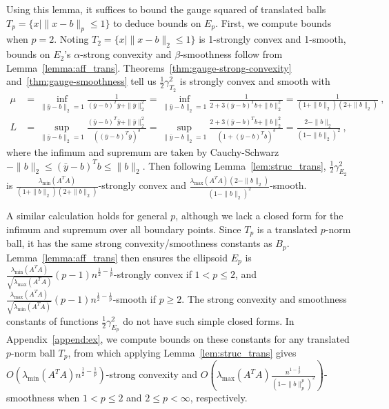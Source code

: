 \documentclass[sn-mathphys,Numbered]{sn-jnl}%
\begin{document}
Using this lemma, it suffices to bound the gauge squared of translated balls $T_p=\{x \mid \|x-b\|_p \leq 1\}$ to deduce bounds on $E_p$.
First, we compute bounds when $p=2$. Noting $T_2=\{x \mid \|x-b\|_2 \leq 1\}$ is 1-strongly convex and 1-smooth, bounds on $E_2$'s $\alpha$-strong convexity and $\beta$-smoothness follow from Lemma~\ref{lemma:aff_trans}. Theorems~\ref{thm:gauge-strong-convexity} and~\ref{thm:gauge-smoothness} tell us $\frac{1}{2}\gamma_{T_2}^2$ is strongly convex and smooth with
\begin{align*}
    \mu &= \inf_{\|\bar y -b\|_2=1} \frac{1}{(\bar y-b)^T\bar y+\|\bar y\|^2_2} = \inf_{\|\bar y -b\|_2=1} \frac{1}{2+3(\bar y-b)^Tb+\|b\|^2_2}
    = \frac{1}{(1+\|b\|_2)(2+\|b\|_2)} \ , \\
    L &= \sup_{\|\bar y -b\|_2=1} \frac{(\bar y-b)^T\bar y+\|\bar y\|_2^2}{((\bar y-b)^T\bar y)^3} = \sup_{\|\bar y -b\|_2=1} \frac{2+3(\bar y-b)^Tb+\|b\|^2_2}{(1+(\bar y-b)^Tb)^3}
    =\frac{2-\|b\|_2}{(1-\|b\|_2)^2} \ ,
\end{align*}
where the infimum and supremum are taken by Cauchy-Schwarz $-\|b\|_2 \leq (\bar y-b)^Tb\leq \|b\|_2$.
Then following Lemma~\ref{lem:struc_trans}, $\frac{1}{2}\gamma_{E_2}^2$ is $\frac{\lambda_{\min}(A^TA)}{(1+\|b\|_2)(2+\|b\|_2)}$-strongly convex and $\frac{\lambda_{\max}(A^TA)(2-\|b\|_2)}{(1-\|b\|_2)^2}$-smooth. 


A similar calculation holds for general $p$, although we lack a closed form for the infimum and supremum over all boundary points. Since $T_p$ is a translated $p$-norm ball, it has the same strong convexity/smoothness constants as $B_p$. Lemma~\ref{lemma:aff_trans} then ensures the ellipsoid $E_p$ is $\frac{\lambda_{\min}(A^TA)}{\sqrt{\lambda_{\max}(A^TA)}}(p-1)n^{\frac{1}{2}-\frac{1}{p}}$-strongly convex if $1<p \leq 2$, and $\frac{\lambda_{\max}(A^TA)}{\sqrt{\lambda_{\min}(A^TA)}}(p-1)n^{\frac{1}{2}-\frac{1}{p}}$-smooth if $p\geq 2$.
The strong convexity and smoothness constants of functions $\frac{1}{2}\gamma^2_{E_p}$ do not have such simple closed forms. In Appendix~\ref{append:ex}, we compute bounds on these constants for any translated $p$-norm ball $T_p$, from which applying Lemma~\ref{lem:struc_trans} gives $O\left(\lambda_{\min}(A^TA)n^{\frac{1}{2}-\frac{1}{p}}\right)$-strong convexity and $O\left(\lambda_{\max}(A^TA)\frac{n^{1-\frac{2}{p}}}{(1-\|b\|_p^p)^2}\right)$-smoothness when $1<p\leq 2$ and $2\leq p<\infty$, respectively.
\end{document}
